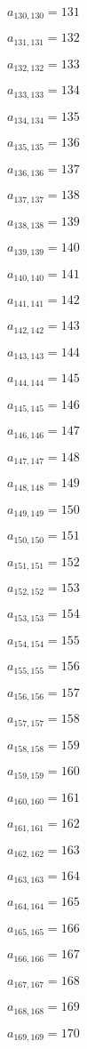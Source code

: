 \documentclass[a4paper,12pt]{article}
\begin{document}
$a _{ 130, 130 } = 131$

$a _{ 131, 131 } = 132$

$a _{ 132, 132 } = 133$

$a _{ 133, 133 } = 134$

$a _{ 134, 134 } = 135$

$a _{ 135, 135 } = 136$

$a _{ 136, 136 } = 137$

$a _{ 137, 137 } = 138$

$a _{ 138, 138 } = 139$

$a _{ 139, 139 } = 140$

$a _{ 140, 140 } = 141$

$a _{ 141, 141 } = 142$

$a _{ 142, 142 } = 143$

$a _{ 143, 143 } = 144$

$a _{ 144, 144 } = 145$

$a _{ 145, 145 } = 146$

$a _{ 146, 146 } = 147$

$a _{ 147, 147 } = 148$

$a _{ 148, 148 } = 149$

$a _{ 149, 149 } = 150$

$a _{ 150, 150 } = 151$

$a _{ 151, 151 } = 152$

$a _{ 152, 152 } = 153$

$a _{ 153, 153 } = 154$

$a _{ 154, 154 } = 155$

$a _{ 155, 155 } = 156$

$a _{ 156, 156 } = 157$

$a _{ 157, 157 } = 158$

$a _{ 158, 158 } = 159$

$a _{ 159, 159 } = 160$

$a _{ 160, 160 } = 161$

$a _{ 161, 161 } = 162$

$a _{ 162, 162 } = 163$

$a _{ 163, 163 } = 164$

$a _{ 164, 164 } = 165$

$a _{ 165, 165 } = 166$

$a _{ 166, 166 } = 167$

$a _{ 167, 167 } = 168$

$a _{ 168, 168 } = 169$

$a _{ 169, 169 } = 170$
\end{document}
